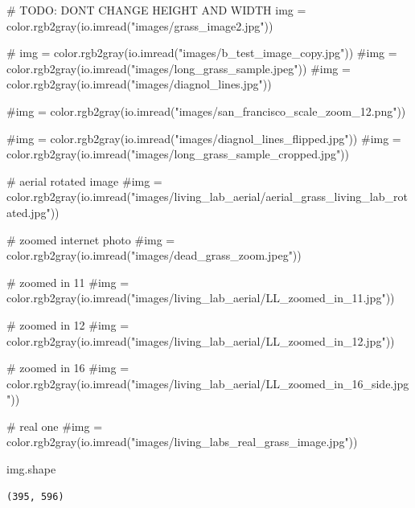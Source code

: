 \documentclass[
  letterpaper,
  DIV=11,
  numbers=noendperiod]{scrreprt}
\newenvironment{Shaded}{\begin{snugshade}}{\end{snugshade}}
\newcommand{\AlertTok}[1]{\textcolor[rgb]{0.68,0.00,0.00}{#1}}
\newcommand{\CommentTok}[1]{\textcolor[rgb]{0.37,0.37,0.37}{#1}}
\newcommand{\NormalTok}[1]{\textcolor[rgb]{0.00,0.23,0.31}{#1}}
\newcommand{\OperatorTok}[1]{\textcolor[rgb]{0.37,0.37,0.37}{#1}}
\newcommand{\StringTok}[1]{\textcolor[rgb]{0.13,0.47,0.30}{#1}}
\begin{document}
\begin{Shaded}
\begin{Highlighting}[]
\CommentTok{\# }\AlertTok{TODO}\CommentTok{: DONT CHANGE HEIGHT AND WIDTH}
\NormalTok{img }\OperatorTok{=}\NormalTok{ color.rgb2gray(io.imread(}\StringTok{"images/grass\_image2.jpg"}\NormalTok{))}

\CommentTok{\# img = color.rgb2gray(io.imread("images/b\_test\_image\_copy.jpg"))}
\CommentTok{\#img = color.rgb2gray(io.imread("images/long\_grass\_sample.jpeg"))}
\CommentTok{\#img = color.rgb2gray(io.imread("images/diagnol\_lines.jpg"))}

\CommentTok{\#img = color.rgb2gray(io.imread("images/san\_francisco\_scale\_zoom\_12.png"))}

\CommentTok{\#img = color.rgb2gray(io.imread("images/diagnol\_lines\_flipped.jpg"))}
\CommentTok{\#img = color.rgb2gray(io.imread("images/long\_grass\_sample\_cropped.jpg"))}

\CommentTok{\# aerial rotated image}
\CommentTok{\#img = color.rgb2gray(io.imread("images/living\_lab\_aerial/aerial\_grass\_living\_lab\_rotated.jpg"))}

\CommentTok{\# zoomed internet photo}
\CommentTok{\#img = color.rgb2gray(io.imread("images/dead\_grass\_zoom.jpeg"))}


\CommentTok{\# zoomed in 11}
\CommentTok{\#img = color.rgb2gray(io.imread("images/living\_lab\_aerial/LL\_zoomed\_in\_11.jpg"))}

\CommentTok{\# zoomed in 12}
\CommentTok{\#img = color.rgb2gray(io.imread("images/living\_lab\_aerial/LL\_zoomed\_in\_12.jpg"))}

\CommentTok{\# zoomed in 16}
\CommentTok{\#img = color.rgb2gray(io.imread("images/living\_lab\_aerial/LL\_zoomed\_in\_16\_side.jpg"))}



\CommentTok{\# real one}
\CommentTok{\#img = color.rgb2gray(io.imread("images/living\_labs\_real\_grass\_image.jpg"))}



\NormalTok{img.shape}
\end{Highlighting}
\end{Shaded}

\begin{verbatim}
(395, 596)
\end{verbatim}
\end{document}

